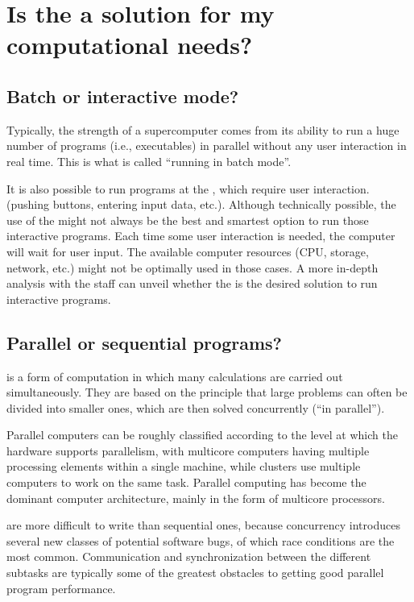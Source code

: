 \section{Is the \hpc a solution for my computational needs?}
\label{sec:is-the-hpc-a-solution-for-my-computational-needs}

\subsection{Batch or interactive mode?}
\label{sec:batch-or-interactive-mode}

Typically, the strength of a supercomputer comes from its ability to run a huge
number of programs (i.e., executables) in parallel without any user interaction
in real time. This is what is called ``running in batch mode''.

It is also possible to run programs at the \hpc, which require user
interaction. (pushing buttons, entering input data, etc.).  Although
technically possible, the use of the \hpc might not always be the best and
smartest option to run those interactive programs.  Each time some user
interaction is needed, the computer will wait for user input. The available
computer resources (CPU, storage, network, etc.) might not be optimally used in
those cases. A more in-depth analysis with the \hpc staff can unveil whether
the \hpc is the desired solution to run interactive programs.

\subsection{Parallel or sequential programs?}
\label{sec:parallel-or-sequential-programs}

 is a form of computation in which many calculations
are carried out simultaneously. They are based on the principle that large
problems can often be divided into smaller ones, which are then solved
concurrently (``in parallel'').

Parallel computers can be roughly classified according to the level at which
the hardware supports parallelism, with multicore computers having multiple
processing elements within a single machine, while clusters use multiple
computers to work on the same task. Parallel computing has become the dominant
computer architecture, mainly in the form of multicore processors.

 are more difficult to write than sequential ones,
because concurrency introduces several new classes of potential software bugs,
of which race conditions are the most common. Communication and synchronization
between the different subtasks are typically some of the greatest obstacles to
getting good parallel program performance.

